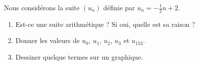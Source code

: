 
\begin{exercice}\label{exosmath-0167}

    Nous considérons la suite \( (u_n)\) définie par \( u_n=-\frac{ 1 }{2}n+2\).
    \begin{enumerate}
        \item
            Est-ce une suite arithmétique ? Si oui, quelle est sa raison ?
        \item
            Donner les valeurs de \( u_0\), \( u_1\), \( u_2\), \( u_3\) et \( u_{153}\).
        \item
            Dessiner quelque termes sur un graphique.
    \end{enumerate}

\end{exercice}

